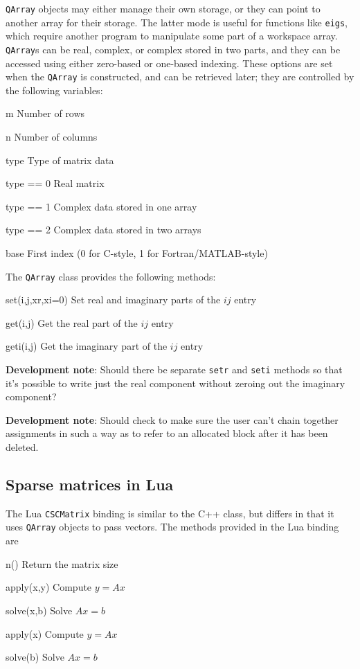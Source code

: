 \documentclass{article}
\newcommand{\devnote}[1]{%
  \begin{trivlist}
  \item\textbf{Development note}: #1
  \end{trivlist}}
\newenvironment{codelist}[1][\quad]%
  {\begin{list}{}{%
   \settowidth{\labelwidth}{\texttt{#1}\hfil}%
   \setlength{\leftmargin}{\labelwidth}%
   \addtolength{\leftmargin}{\labelsep}%
   \addtolength{\leftmargin}{\parindent}%
   \renewcommand{\makelabel}[1]{\texttt{##1}}}}%
  {\end{list}}
\newcommand{\ttt}[1]{\texttt{#1}}
\begin{document}
\ttt{QArray} objects may either manage their own storage, or they can
point to another array for their storage.  The latter mode is useful
for functions like \ttt{eigs}, which require another program to
manipulate some part of a workspace array.  \ttt{QArray}s can be real,
complex, or complex stored in two parts, and they can be accessed
using either zero-based or one-based indexing.  These options are set
when the \ttt{QArray} is constructed, and can be retrieved later; they
are controlled by the following variables:
\begin{codelist}[base]
  \item[m]     Number of rows
  \item[n]     Number of columns
  \item[type]  Type of matrix data
    \begin{codelist}
      \item[type == 0]  Real matrix
      \item[type == 1]  Complex data stored in one array
      \item[type == 2]  Complex data stored in two arrays
    \end{codelist}
  \item[base]  First index (0 for C-style, 1 for Fortran/MATLAB-style)
\end{codelist}
The \ttt{QArray} class provides the following methods:
\begin{codelist}[set(i,j,xr,xi=0)]
  \item[set(i,j,xr,xi=0)]  Set real and imaginary parts of the $ij$ entry
  \item[get(i,j)]  Get the real part of the $ij$ entry
  \item[geti(i,j)] Get the imaginary part of the $ij$ entry
\end{codelist}

\devnote{Should there be separate \ttt{setr} and \ttt{seti} methods so
  that it's possible to write just the real component without zeroing out
  the imaginary component?}

\devnote{Should check to make sure the user can't chain together
  assignments in such a way as to refer to an allocated block after it
  has been deleted.}


\subsection{Sparse matrices in Lua}

The Lua \ttt{CSCMatrix} binding is similar to the C++ class, but
differs in that it uses \ttt{QArray} objects to pass vectors.  The
methods provided in the Lua binding are
\begin{codelist}[spply(x,b)]
  \item[n()]         Return the matrix size
  \item[apply(x,y)]  Compute $y = Ax$
  \item[solve(x,b)]  Solve $Ax = b$
  \item[apply(x)]    Compute $y = Ax$
  \item[solve(b)]    Solve $Ax = b$
\end{codelist}
\end{document}
